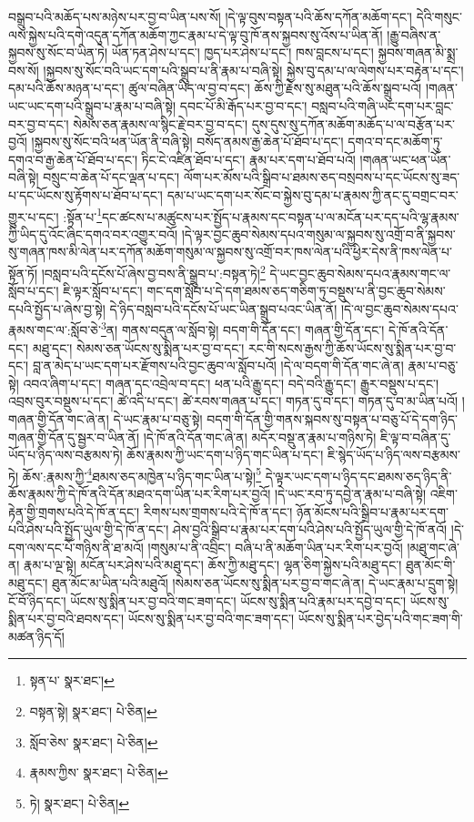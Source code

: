 བསྒྲུབ་པའི་མཆོད་པས་མཉེས་པར་བྱ་བ་ཡིན་པས་སོ། །དེ་ལྟ་བུས་བསྟན་པའི་ཆོས་དཀོན་མཆོག་དང་། དེའི་གསུང་ལས་སྐྱེས་པའི་དགེ་འདུན་དཀོན་མཆོག་ཀྱང་རྣམ་པ་དེ་ལྟ་བུ་ཁོ་ནས་སྐྱབས་སུ་འོས་པ་ཡིན་ནོ། །རྒྱུ་བཞིས་ན་སྐྱབས་སུ་སོང་བ་ཡིན་ཏེ། ཡོན་ཏན་ཤེས་པ་དང་། ཁྱད་པར་ཤེས་པ་དང་། ཁས་བླངས་པ་དང་། སྐྱབས་གཞན་མི་སྨྲ་བས་སོ། །སྐྱབས་སུ་སོང་བའི་ཡང་དག་པའི་སྒྲུབ་པ་ནི་རྣམ་པ་བཞི་སྟེ། སྐྱེས་བུ་དམ་པ་ལ་ལེགས་པར་བརྟེན་པ་དང་། དམ་པའི་ཆོས་མཉན་པ་དང་། ཚུལ་བཞིན་ཡིད་ལ་བྱ་བ་དང་། ཆོས་ཀྱི་རྗེས་སུ་མཐུན་པའི་ཆོས་སྒྲུབ་པའོ། །གཞན་ཡང་ཡང་དག་པའི་སྒྲུབ་པ་རྣམ་པ་བཞི་སྟེ། དབང་པོ་མི་རྒོད་པར་བྱ་བ་དང་། བསླབ་པའི་གཞི་ཡང་དག་པར་བླང་བར་བྱ་བ་དང་། སེམས་ཅན་རྣམས་ལ་སྙིང་རྗེ་བར་བྱ་བ་དང་། དུས་དུས་སུ་དཀོན་མཆོག་མཆོད་པ་ལ་བརྩོན་པར་བྱའོ། །སྐྱབས་སུ་སོང་བའི་ཕན་ཡོན་ནི་བཞི་སྟེ། བསོད་ནམས་རྒྱ་ཆེན་པོ་ཐོབ་པ་དང་། དགའ་བ་དང་མཆོག་ཏུ་དགའ་བ་རྒྱ་ཆེན་པོ་ཐོབ་པ་དང་། ཏིང་ངེ་འཛིན་ཐོབ་པ་དང་། རྣམ་པར་དག་པ་ཐོབ་པའོ། །གཞན་ཡང་ཕན་ཡོན་བཞི་སྟེ། བསྲུང་བ་ཆེན་པོ་དང་ལྡན་པ་དང་། ལོག་པར་མོས་པའི་སྒྲིབ་པ་ཐམས་ཅད་བསྲབས་པ་དང་ཡོངས་སུ་ཟད་པ་དང་ཡོངས་སུ་རྟོགས་པ་ཐོབ་པ་དང་། དམ་པ་ཡང་དག་པར་སོང་བ་སྐྱེས་བུ་དམ་པ་རྣམས་ཀྱི་ནང་དུ་བགྲང་བར་གྱུར་པ་དང་། :སྟོན་པ་\footnote{སྟན་པ་  སྣར་ཐང་། }དང་ཚངས་པ་མཚུངས་པར་སྤྱོད་པ་རྣམས་དང་བསྟན་པ་ལ་མངོན་པར་དད་པའི་ལྷ་རྣམས་ཀྱི་ཡིད་དུ་འོང་ཞིང་དགའ་བར་འགྱུར་བའོ། །དེ་ལྟར་བྱང་ཆུབ་སེམས་དཔའ་གསུམ་ལ་སྐྱབས་སུ་འགྲོ་བ་ནི་སྐྱབས་སུ་གཞན་ཁས་མི་ལེན་པར་དཀོན་མཆོག་གསུམ་ལ་སྐྱབས་སུ་འགྲོ་བར་ཁས་ལེན་པའི་ཕྱིར་དེས་ནི་ཁས་ལེན་པ་སྟོན་ཏོ། །བསླབ་པའི་དངོས་པོ་ཞེས་བྱ་བས་ནི་སྒྲུབ་པ་:བསྟན་ཏེ།\footnote{བསྟན་སྟེ།  སྣར་ཐང་།  པེ་ཅིན། } དེ་ཡང་བྱང་ཆུབ་སེམས་དཔའ་རྣམས་གང་ལ་སློབ་པ་དང་། ཇི་ལྟར་སློབ་པ་དང་། གང་དག་སློབ་པ་དེ་དག་ཐམས་ཅད་གཅིག་ཏུ་བསྡུས་པ་ནི་བྱང་ཆུབ་སེམས་དཔའི་སྤྱོད་པ་ཞེས་བྱ་སྟེ། དེ་ཉིད་བསླབ་པའི་དངོས་པོ་ཡང་ཡིན་སྒྲུབ་པའང་ཡིན་ནོ། །དེ་ལ་བྱང་ཆུབ་སེམས་དཔའ་རྣམས་གང་ལ་:སློབ་ཅེ་\footnote{སློབ་ཅེས་  སྣར་ཐང་།  པེ་ཅིན། }ན། གནས་བདུན་ལ་སློབ་སྟེ། བདག་གི་དོན་དང་། གཞན་གྱི་དོན་དང་། དེ་ཁོ་ནའི་དོན་དང་། མཐུ་དང་། སེམས་ཅན་ཡོངས་སུ་སྨིན་པར་བྱ་བ་དང་། རང་གི་སངས་རྒྱས་ཀྱི་ཆོས་ཡོངས་སུ་སྨིན་པར་བྱ་བ་དང་། བླ་ན་མེད་པ་ཡང་དག་པར་རྫོགས་པའི་བྱང་ཆུབ་ལ་སློབ་པའོ། །དེ་ལ་བདག་གི་དོན་གང་ཞེ་ན། རྣམ་པ་བཅུ་སྟེ། འབའ་ཞིག་པ་དང་། གཞན་དང་འབྲེལ་བ་དང་། ཕན་པའི་རྒྱུ་དང་། བདེ་བའི་རྒྱུ་དང་། རྒྱུར་བསྡུས་པ་དང་། འབྲས་བུར་བསྡུས་པ་དང་། ཚེ་འདི་པ་དང་། ཚེ་རབས་གཞན་པ་དང་། གཏན་དུ་བ་དང་། གཏན་དུ་བ་མ་ཡིན་པའོ། །གཞན་གྱི་དོན་གང་ཞེ་ན། དེ་ཡང་རྣམ་པ་བཅུ་སྟེ། བདག་གི་དོན་གྱི་གནས་སྐབས་སུ་བསྟན་པ་བཅུ་པོ་དེ་དག་ཉིད་གཞན་གྱི་དོན་དུ་སྦྱར་བ་ཡིན་ནོ། །དེ་ཁོ་ནའི་དོན་གང་ཞེ་ན། མདོར་བསྡུ་ན་རྣམ་པ་གཉིས་ཏེ། ཇི་ལྟ་བ་བཞིན་དུ་ཡོད་པ་ཉིད་ལས་བརྩམས་ཏེ། ཆོས་རྣམས་ཀྱི་ཡང་དག་པ་ཉིད་གང་ཡིན་པ་དང་། ཇི་སྙེད་ཡོད་པ་ཉིད་ལས་བརྩམས་ཏེ། ཆོས་:རྣམས་ཀྱི་\footnote{རྣམས་ཀྱིས་  སྣར་ཐང་།  པེ་ཅིན། }ཐམས་ཅད་མཁྱེན་པ་ཉིད་གང་ཡིན་པ་སྟེ།\footnote{ཏེ།  སྣར་ཐང་།  པེ་ཅིན། } དེ་ལྟར་ཡང་དག་པ་ཉིད་དང་ཐམས་ཅད་ཉིད་ནི་ཆོས་རྣམས་ཀྱི་དེ་ཁོ་ནའི་དོན་མཐའ་དག་ཡིན་པར་རིག་པར་བྱའོ། །དེ་ཡང་རབ་ཏུ་དབྱེ་ན་རྣམ་པ་བཞི་སྟེ། འཇིག་རྟེན་གྱི་གྲགས་པའི་དེ་ཁོ་ན་དང་། རིགས་པས་གྲགས་པའི་དེ་ཁོ་ན་དང་། ཉོན་མོངས་པའི་སྒྲིབ་པ་རྣམ་པར་དག་པའི་ཤེས་པའི་སྤྱོད་ཡུལ་གྱི་དེ་ཁོ་ན་དང་། ཤེས་བྱའི་སྒྲིབ་པ་རྣམ་པར་དག་པའི་ཤེས་པའི་སྤྱོད་ཡུལ་གྱི་དེ་ཁོ་ནའོ། །དེ་དག་ལས་དང་པོ་གཉིས་ནི་ཐ་མའོ། །གསུམ་པ་ནི་འབྲིང་། བཞི་པ་ནི་མཆོག་ཡིན་པར་རིག་པར་བྱའོ། །མཐུ་གང་ཞེ་ན། རྣམ་པ་ལྔ་སྟེ། མངོན་པར་ཤེས་པའི་མཐུ་དང་། ཆོས་ཀྱི་མཐུ་དང་། ལྷན་ཅིག་སྐྱེས་པའི་མཐུ་དང་། ཐུན་མོང་གི་མཐུ་དང་། ཐུན་མོང་མ་ཡིན་པའི་མཐུའོ། །སེམས་ཅན་ཡོངས་སུ་སྨིན་པར་བྱ་བ་གང་ཞེ་ན། དེ་ཡང་རྣམ་པ་དྲུག་སྟེ། ངོ་བོ་ཉིད་དང་། ཡོངས་སུ་སྨིན་པར་བྱ་བའི་གང་ཟག་དང་། ཡོངས་སུ་སྨིན་པའི་རྣམ་པར་དབྱེ་བ་དང་། ཡོངས་སུ་སྨིན་པར་བྱ་བའི་ཐབས་དང་། ཡོངས་སུ་སྨིན་པར་བྱ་བའི་གང་ཟག་དང་། ཡོངས་སུ་སྨིན་པར་བྱེད་པའི་གང་ཟག་གི་མཚན་ཉིད་དོ། 